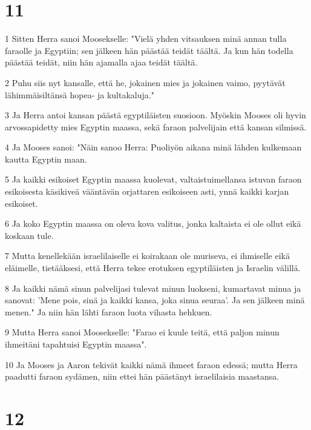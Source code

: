 \chapter{11}

\par 1 Sitten Herra sanoi Moosekselle: "Vielä yhden vitsauksen minä annan tulla faraolle ja Egyptiin; sen jälkeen hän päästää teidät täältä. Ja kun hän todella päästää teidät, niin hän ajamalla ajaa teidät täältä.
\par 2 Puhu siis nyt kansalle, että he, jokainen mies ja jokainen vaimo, pyytävät lähimmäisiltänsä hopea- ja kultakaluja."
\par 3 Ja Herra antoi kansan päästä egyptiläisten suosioon. Myöskin Mooses oli hyvin arvossapidetty mies Egyptin maassa, sekä faraon palvelijain että kansan silmissä.
\par 4 Ja Mooses sanoi: "Näin sanoo Herra: Puoliyön aikana minä lähden kulkemaan kautta Egyptin maan.
\par 5 Ja kaikki esikoiset Egyptin maassa kuolevat, valtaistuimellansa istuvan faraon esikoisesta käsikiveä vääntävän orjattaren esikoiseen asti, ynnä kaikki karjan esikoiset.
\par 6 Ja koko Egyptin maassa on oleva kova valitus, jonka kaltaista ei ole ollut eikä koskaan tule.
\par 7 Mutta kenellekään israelilaiselle ei koirakaan ole muriseva, ei ihmiselle eikä eläimelle, tietääksesi, että Herra tekee erotuksen egyptiläisten ja Israelin välillä.
\par 8 Ja kaikki nämä sinun palvelijasi tulevat minun luokseni, kumartavat minua ja sanovat: 'Mene pois, sinä ja kaikki kansa, joka sinua seuraa'. Ja sen jälkeen minä menen." Ja niin hän lähti faraon luota vihasta hehkuen.
\par 9 Mutta Herra sanoi Moosekselle: "Farao ei kuule teitä, että paljon minun ihmeitäni tapahtuisi Egyptin maassa".
\par 10 Ja Mooses ja Aaron tekivät kaikki nämä ihmeet faraon edessä; mutta Herra paadutti faraon sydämen, niin ettei hän päästänyt israelilaisia maastansa.

\chapter{12}

